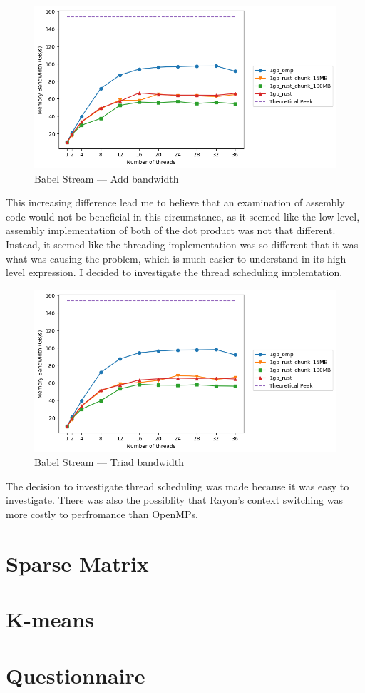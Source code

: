 \begin{figure}[h]
\centering
\includegraphics[width=.9\linewidth]{figs/babel/Add.png}
\caption{Babel Stream --- Add bandwidth}\label{fig:babel-add}
\end{figure}

This increasing difference lead me to believe that an examination of assembly code would not be beneficial in this circumstance, as it seemed like the low level, assembly implementation of both of the dot product was not that different. Instead, it seemed like the threading implementation was so different that it was what was causing the problem, which is much easier to understand in its high level expression. I decided to investigate the thread scheduling implemtation.

\begin{figure}[h]
\centering
\includegraphics[width=.9\linewidth]{figs/babel/Triad.png}
\caption{Babel Stream --- Triad bandwidth}\label{fig:babel-triad}
\end{figure}

The decision to investigate thread scheduling was made because it was easy to investigate. There was also the possiblity that Rayon's context switching was more costly to perfromance than OpenMPs.
\section{Sparse Matrix}\label{sec:res-sparse}
\section{K-means}
\section{Questionnaire}
